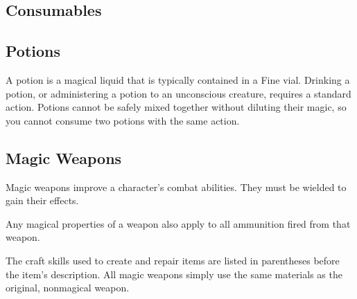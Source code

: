   

  \begin{longcolumn}
    \section{Consumables}\label{Consumables}

      \subsection{Potions}
        A potion is a magical liquid that is typically contained in a Fine vial.
        Drinking a potion, or administering a potion to an unconscious creature, requires a standard action.
        Potions cannot be safely mixed together without diluting their magic, so you cannot consume two potions with the same action.

        
  \end{longcolumn}

  

\begin{longcolumn}
    \section{Magic Weapons}\label{Magic Weapons}
    \begin{longtablepreface}

      Magic weapons improve a character's combat abilities.
      They must be wielded to gain their effects.

       Any magical properties of a  weapon also apply to all ammunition fired from that weapon.

       The craft skills used to create and repair items are listed in parentheses before the item's description.
      All magic weapons simply use the same materials as the original, nonmagical weapon.
    \end{longtablepreface}

    

\end{longcolumn}

